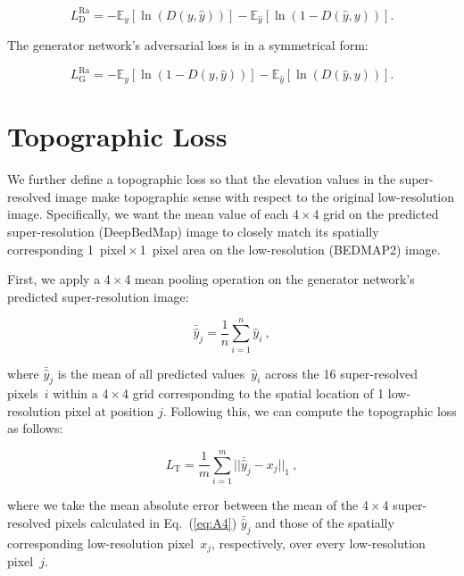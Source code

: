 \begin{equation}\label{eq:A2}
  L_{\mathrm{D}}^{\text{Ra}} = - \mathbb{E}_y[\ln(D(y,\hat{y}))] - \mathbb{E}_{\hat{y}}[\ln(1 - D(\hat{y},y))].
\end{equation}

The generator network's adversarial loss is in a symmetrical form:

\begin{equation}\label{eq:A3}
  L_{\mathrm{G}}^{\text{Ra}} = - \mathbb{E}_y[\ln(1 - D(y,\hat{y}))] - \mathbb{E}_{\hat{y}}[\ln(D(\hat{y},y))].
\end{equation}

\section{Topographic Loss}

We further define a topographic loss so that the elevation values in the super-resolved image make topographic sense with respect to the original low-resolution image.
Specifically, we want the mean value of each 4\,$\times$\,4 grid on the predicted super-resolution (DeepBedMap) image to closely match its spatially corresponding \SI{1}{pixel}\,$\times$\,\SI{1}{pixel} area on the low-resolution (BEDMAP2) image.

First, we apply a 4\,$\times$\,4 mean pooling operation on the generator network's predicted super-resolution image:

\begin{equation}\label{eq:A4}
  \bar{\hat{y}}_j = \dfrac{1}{n} \sum\limits_{i=1}^n \hat{y}_i~,
\end{equation}

where $\bar{\hat{y}}_j$ is the mean of all predicted values~$\hat{y}_i$ across the 16 super-resolved pixels~$i$ within a 4\,$\times$\,4 grid corresponding to the spatial location of 1 low-resolution pixel at position $j$.
Following this, we can compute the topographic loss as follows:

\begin{equation}\label{eq:A5}
  L_{\mathrm{T}} = \dfrac{1}{m} \sum\limits_{i=1}^m ||\bar{\hat{y}}_j - x_j||_{1}~,
\end{equation}

where we take the mean absolute error between the mean of the 4\,$\times$\,4 super-resolved pixels calculated in Eq.~(\ref{eq:A4}) $\bar{\hat{y}}_j$ and those of the spatially corresponding low-resolution pixel~$x_j$, respectively, over every low-resolution pixel~$j$.

